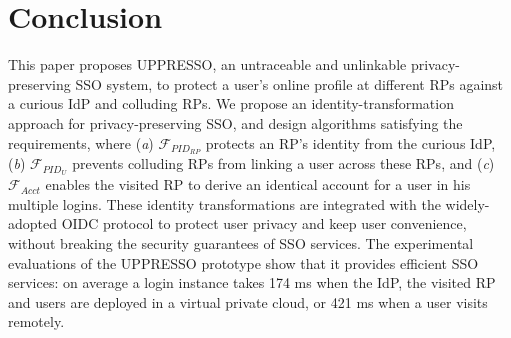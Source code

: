 \section{Conclusion}
\label{sec:conclusion}
This paper proposes UPPRESSO, an untraceable and unlinkable privacy-preserving SSO system,
 to protect a user's online profile at different RPs against a curious IdP and colluding RPs.
We propose an identity-transformation approach for privacy-preserving SSO,
 and design algorithms satisfying the requirements,
 where (\emph{a}) $\mathcal{F}_{PID_{RP}}$ protects an RP's identity from the curious IdP,
(\emph{b})  $\mathcal{F}_{PID_{U}}$ prevents colluding RPs from linking a user across these RPs,
 and (\emph{c}) $\mathcal{F}_{Acct}$ enables the visited RP to derive an identical account for a user in his multiple logins.
These identity transformations are integrated with the widely-adopted OIDC protocol
    to protect user privacy and keep user convenience,
    without breaking the security guarantees of SSO services.
The experimental evaluations of the UPPRESSO prototype show
 that it provides efficient SSO services:
  on average a login instance takes 174 ms when the IdP, the visited RP and users are deployed in a virtual private cloud, or 421 ms when a user visits remotely.



